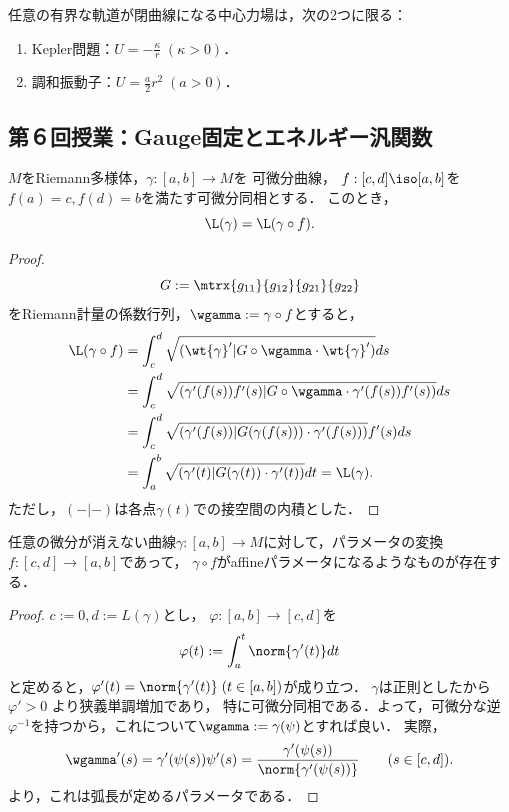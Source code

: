 \documentclass[uplatex,dvipdfmx]{jsarticle}
\begin{document}
\begin{exercise}[中心力場の特徴付け]
    任意の有界な軌道が閉曲線になる中心力場は，次の2つに限る：
    \begin{enumerate}
        \item Kepler問題：$U=-\frac{\kappa}{r}\;(\kappa>0)$．
        \item 調和振動子：$U=\frac{a}{2}r^2\;(a>0)$．
    \end{enumerate}
\end{exercise}

\subsection{第６回授業：Gauge固定とエネルギー汎関数}

\begin{exercise}[長さ汎関数のgauge変換不変性]
    $M$をRiemann多様体，$\gamma:[a,b]\to M$を
    可微分曲線，
    $f:[c,d]\iso[a,b]$を$f(a)=c,f(d)=b$を満たす可微分同相とする．
    このとき，
    \[\L(\gamma)=\L(\gamma\circ f).\]
\end{exercise}
\begin{proof}
    \[G:=\mtrx{g_{11}}{g_{12}}{g_{21}}{g_{22}}\]
    をRiemann計量の係数行列，$\wgamma:=\gamma\circ f$とすると，
    \begin{align*}
        \L(\gamma\circ f)&=\int^d_c\sqrt{(\wt{\gamma}'|G\circ\wgamma\cdot\wt{\gamma}')}ds\\
        &=\int^d_c\sqrt{(\gamma'(f(s))f'(s)|G\circ\wgamma\cdot\gamma'(f(s))f'(s))}ds\\
        &=\int^d_c\sqrt{(\gamma'(f(s))|G(\gamma(f(s)))\cdot\gamma'(f(s)))}f'(s)ds\\
        &=\int^b_a\sqrt{(\gamma'(t)|G(\gamma(t))\cdot\gamma'(t))}dt=\L(\gamma).
    \end{align*}
    ただし，$(-|-)$は各点$\gamma(t)$での接空間の内積とした．
\end{proof}

\begin{exercise}[affineパラメータへの取替]
    任意の微分が消えない曲線$\gamma:[a,b]\to M$に対して，パラメータの変換$f:[c,d]\to[a,b]$であって，
    $\gamma\circ f$がaffineパラメータになるようなものが存在する．
\end{exercise}
\begin{proof}
    $c:=0,d:=L(\gamma)$とし，
    $\varphi:[a,b]\to[c,d]$を
    \[\varphi(t):=\int^{t}_a\norm{\gamma'(t)}dt\]
    と定めると，$\varphi'(t)=\norm{\gamma'(t)}\;(t\in[a,b])$が成り立つ．
    $\gamma$は正則としたから$\varphi'>0$
    より狭義単調増加であり，
    特に可微分同相である．よって，可微分な逆$\varphi^{-1}$を持つから，これについて$\wgamma:=\gamma(\psi)$とすれば良い．
    実際，
    \[\wgamma'(s)=\gamma'(\psi(s))\psi'(s)=\frac{\gamma'(\psi(s))}{\norm{\gamma'(\psi(s))}}\qquad(s\in[c,d]).\]
    より，これは弧長が定めるパラメータである．
\end{proof}
\end{document}
